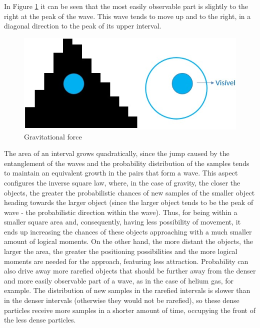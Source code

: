 In Figure \ref{fig:consciousness_gravitational_force} it can be seen that the most easily observable part is slightly to the right at the peak of the wave. This wave tends to move up and to the right, in a diagonal direction to the peak of its upper interval. 
	\begin{figure}[H]
	\caption{Gravitational force}
	\label{fig:consciousness_gravitational_force}
	\centering
	\includegraphics[scale=.7]{sections/images/consciousness_gravitational_force.jpg}
	\end{figure}

The area of an interval grows quadratically, since the jump caused by the entanglement of the waves and the probability distribution of the samples tends to maintain an equivalent growth in the pairs that form a wave. This aspect configures the inverse square law, where, in the case of gravity, the closer the objects, the greater the probabilistic chances of new samples of the smaller object heading towards the larger object (since the larger object tends to be the peak of wave - the probabilistic direction within the wave). Thus, for being within a smaller square area and, consequently, having less possibility of movement, it ends up increasing the chances of these objects approaching with a much smaller amount of logical moments. On the other hand, the more distant the objects, the larger the area, the greater the positioning possibilities and the more logical moments are needed for the approach, featuring less attraction. Probability can also drive away more rarefied objects that should be further away from the denser and more easily observable part of a wave, as in the case of helium gas, for example. The distribution of new samples in the rarefied intervals is slower than in the denser intervals (otherwise they would not be rarefied), so these dense particles receive more samples in a shorter amount of time, occupying the front of the less dense particles.

